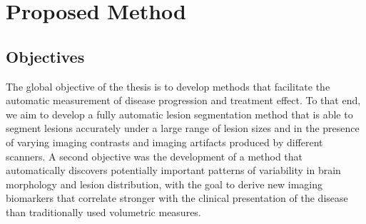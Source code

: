 % 

\section{Proposed Method}

\subsection{Objectives}


The global objective of the thesis is to develop methods that facilitate the
automatic measurement of disease progression and treatment effect. To that end,
we aim to develop a fully automatic lesion segmentation method that is able
to segment lesions accurately under a large range of lesion sizes and in the
presence of varying imaging contrasts and imaging artifacts produced by
different scanners. A second objective was the development of a method that
automatically discovers potentially important patterns of variability in brain
morphology and lesion distribution, with the goal to derive new imaging
biomarkers that correlate stronger with the clinical presentation of the disease
than traditionally used volumetric measures.

